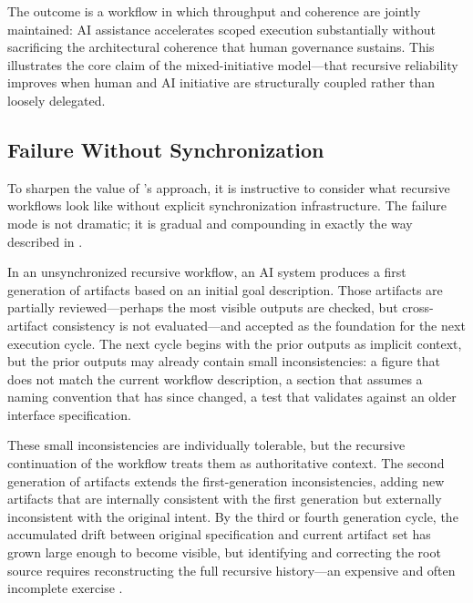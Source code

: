 The outcome is a workflow in which throughput and coherence are jointly maintained: AI assistance accelerates scoped execution substantially without sacrificing the architectural coherence that human governance sustains. This illustrates the core claim of the mixed-initiative model---that recursive reliability improves when human and AI initiative are structurally coupled rather than loosely delegated.

\subsection{Failure Without Synchronization}

To sharpen the value of 's approach, it is instructive to consider what recursive workflows look like without explicit synchronization infrastructure. The failure mode is not dramatic; it is gradual and compounding in exactly the way described in .

In an unsynchronized recursive workflow, an AI system produces a first generation of artifacts based on an initial goal description. Those artifacts are partially reviewed---perhaps the most visible outputs are checked, but cross-artifact consistency is not evaluated---and accepted as the foundation for the next execution cycle. The next cycle begins with the prior outputs as implicit context, but the prior outputs may already contain small inconsistencies: a figure that does not match the current workflow description, a section that assumes a naming convention that has since changed, a test that validates against an older interface specification.

These small inconsistencies are individually tolerable, but the recursive continuation of the workflow treats them as authoritative context. The second generation of artifacts extends the first-generation inconsistencies, adding new artifacts that are internally consistent with the first generation but externally inconsistent with the original intent. By the third or fourth generation cycle, the accumulated drift between original specification and current artifact set has grown large enough to become visible, but identifying and correcting the root source requires reconstructing the full recursive history---an expensive and often incomplete exercise \cite{Jimenez2024SWEBench}.

